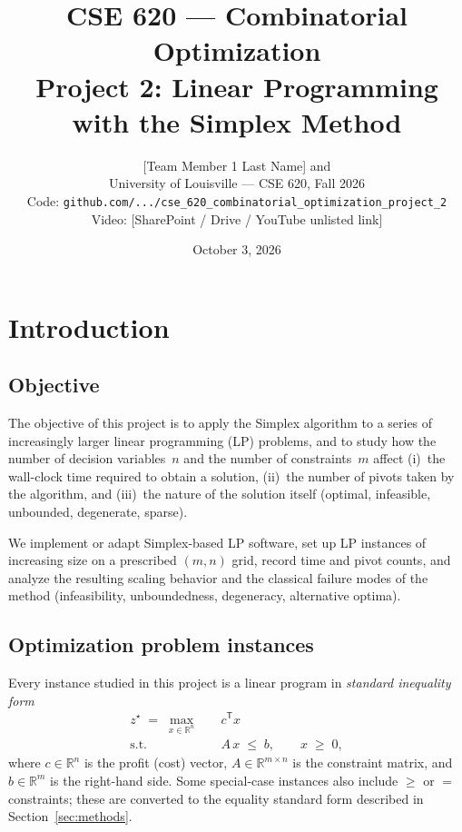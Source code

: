 \documentclass[10pt]{article}
\title{\textbf{CSE 620 --- Combinatorial Optimization}\\[4pt]
\large Project 2: Linear Programming with the Simplex Method}
\author{%
  [Team Member 1 Last Name] \quad and \quad [Team Member 2 Last Name]\\
  \normalsize University of Louisville --- CSE 620, Fall 2026\\
  \normalsize Code: \texttt{github.com/.../cse\_620\_combinatorial\_optimization\_project\_2}\\
  \normalsize Video: [SharePoint / Drive / YouTube unlisted link]
}
\date{October 3, 2026}
\begin{document}
\maketitle

\section{Introduction}
\label{sec:intro}

\subsection{Objective}
The objective of this project is to apply the Simplex algorithm to a series of
increasingly larger linear programming (LP) problems, and to study how the
number of decision variables~$n$ and the number of constraints~$m$ affect
(i)~the wall-clock time required to obtain a solution,
(ii)~the number of pivots taken by the algorithm, and
(iii)~the nature of the solution itself (optimal, infeasible, unbounded,
degenerate, sparse).

We implement or adapt Simplex-based LP software, set up LP instances of
increasing size on a prescribed $(m,n)$ grid, record time and pivot counts,
and analyze the resulting scaling behavior and the classical failure modes of
the method (infeasibility, unboundedness, degeneracy, alternative optima).

\subsection{Optimization problem instances}
Every instance studied in this project is a linear program in
\emph{standard inequality form}
\begin{equation}
\label{eq:lp}
\begin{aligned}
z^\star \;=\; \max_{x \in \mathbb{R}^n}\quad & c^{\mathsf T} x \\
\text{s.t.}\quad & A\, x \;\le\; b, \qquad x \;\ge\; 0,
\end{aligned}
\end{equation}
where $c \in \mathbb{R}^n$ is the profit (cost) vector,
$A \in \mathbb{R}^{m \times n}$ is the constraint matrix, and
$b \in \mathbb{R}^m$ is the right-hand side.  Some special-case instances also
include $\ge$ or $=$ constraints; these are converted to the equality
standard form described in Section~\ref{sec:methods}.
\end{document}
